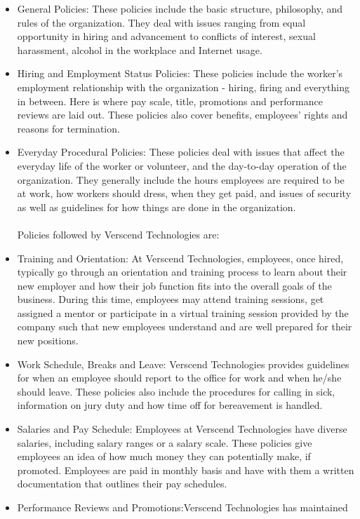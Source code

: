 \begin{itemize}
\item
General Policies: These policies include the basic structure, philosophy, and rules of the organization.
They deal with issues ranging from equal opportunity in hiring and advancement to conflicts of
interest, sexual harassment, alcohol in the workplace and Internet usage.
\item
Hiring and Employment Status Policies: These policies include the worker's employment
relationship with the organization - hiring, firing and everything in between. Here is where pay scale,
title, promotions and performance reviews are laid out. These policies also cover benefits, employees'
rights and reasons for termination.
\item
Everyday Procedural Policies: These policies deal with issues that affect the everyday life of the
worker or volunteer, and the day-to-day operation of the organization. They generally include the
hours employees are required to be at work, how workers should dress, when they get paid, and issues
of security as well as guidelines for how things are done in the organization.\\
\\Policies followed by Verscend Technologies are:
\item
Training and Orientation: At Verscend Technologies, employees, once hired, typically go
through an orientation and training process to learn about their new employer and how their job
function fits into the overall goals of the business. During this time, employees may attend training
sessions, get assigned a mentor or participate in a virtual training session provided by the company
such that new employees understand and are well prepared for their new positions.
\item
Work Schedule, Breaks and Leave: Verscend Technologies provides guidelines for when
an employee should report to the office for work and when he/she should leave. These policies also
include the procedures for calling in sick, information on jury duty and how time off for bereavement
is handled.
\item
Salaries and Pay Schedule: Employees at Verscend Technologies have diverse salaries,
including salary ranges or a salary scale. These policies give employees an idea of how much money
they can potentially make, if promoted. Employees are paid in monthly basis and have with them
a
written documentation that outlines their pay schedules.
\item
Performance Reviews and Promotions:Verscend Technologies has maintained

\end{itemize}
